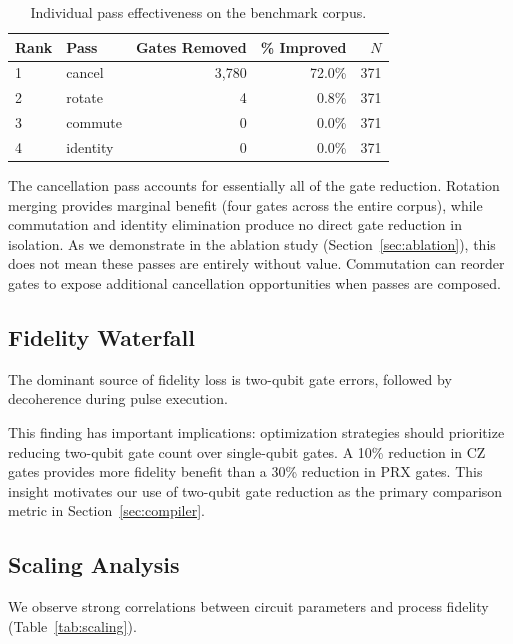\documentclass[sigconf,nonacm]{acmart}
\begin{document}
\begin{table}[t]
\centering
\caption{Individual pass effectiveness on the benchmark corpus.}
\label{tab:passes}
\begin{tabular}{llrrr}
\toprule
\textbf{Rank} & \textbf{Pass} & \textbf{Gates Removed} & \textbf{\% Improved} & \textbf{$N$} \\
\midrule
1 & cancel & 3{,}780 & 72.0\% & 371 \\
2 & rotate & 4 & 0.8\% & 371 \\
3 & commute & 0 & 0.0\% & 371 \\
4 & identity & 0 & 0.0\% & 371 \\
\bottomrule
\end{tabular}
\end{table}

The cancellation pass accounts for essentially all of the gate reduction. Rotation merging provides marginal benefit (four gates across the entire corpus), while commutation and identity elimination produce no direct gate reduction in isolation. As we demonstrate in the ablation study (Section~\ref{sec:ablation}), this does not mean these passes are entirely without value. Commutation can reorder gates to expose additional cancellation opportunities when passes are composed.

\subsection{Fidelity Waterfall}

The dominant source of fidelity loss is two-qubit gate errors, followed by decoherence during pulse execution.

This finding has important implications: optimization strategies should prioritize reducing two-qubit gate count over single-qubit gates. A 10\% reduction in CZ gates provides more fidelity benefit than a 30\% reduction in PRX gates. This insight motivates our use of two-qubit gate reduction as the primary comparison metric in Section~\ref{sec:compiler}.

\subsection{Scaling Analysis}

We observe strong correlations between circuit parameters and process fidelity (Table~\ref{tab:scaling}).
\end{document}
